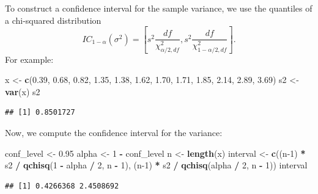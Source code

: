 \documentclass[
]{article}
\newenvironment{Shaded}{\begin{snugshade}}{\end{snugshade}}
\newcommand{\DecValTok}[1]{\textcolor[rgb]{0.00,0.00,0.81}{#1}}
\newcommand{\FloatTok}[1]{\textcolor[rgb]{0.00,0.00,0.81}{#1}}
\newcommand{\FunctionTok}[1]{\textcolor[rgb]{0.13,0.29,0.53}{\textbf{#1}}}
\newcommand{\NormalTok}[1]{#1}
\newcommand{\OtherTok}[1]{\textcolor[rgb]{0.56,0.35,0.01}{#1}}
\newcommand{\SpecialCharTok}[1]{\textcolor[rgb]{0.81,0.36,0.00}{\textbf{#1}}}
\begin{document}
To construct a confidence interval for the sample variance, we use the
quantiles of a chi-squared distribution
\[IC_{1-\alpha}(\sigma^2) = \left[ s^2 \frac{df}{\chi^2_{\alpha/2, df}}, s^2 \frac{df}{\chi^2_{1 - \alpha/2, df}} \right].\]
For example:

\begin{Shaded}
\begin{Highlighting}[]
\NormalTok{x }\OtherTok{\textless{}{-}} \FunctionTok{c}\NormalTok{(}\FloatTok{0.39}\NormalTok{, }\FloatTok{0.68}\NormalTok{, }\FloatTok{0.82}\NormalTok{, }\FloatTok{1.35}\NormalTok{, }\FloatTok{1.38}\NormalTok{, }\FloatTok{1.62}\NormalTok{, }\FloatTok{1.70}\NormalTok{, }\FloatTok{1.71}\NormalTok{, }\FloatTok{1.85}\NormalTok{, }\FloatTok{2.14}\NormalTok{, }\FloatTok{2.89}\NormalTok{, }\FloatTok{3.69}\NormalTok{)}
\NormalTok{s2 }\OtherTok{\textless{}{-}} \FunctionTok{var}\NormalTok{(x)}
\NormalTok{s2}
\end{Highlighting}
\end{Shaded}

\begin{verbatim}
## [1] 0.8501727
\end{verbatim}

Now, we compute the confidence interval for the variance:

\begin{Shaded}
\begin{Highlighting}[]
\NormalTok{conf\_level }\OtherTok{\textless{}{-}} \FloatTok{0.95}
\NormalTok{alpha }\OtherTok{\textless{}{-}} \DecValTok{1} \SpecialCharTok{{-}}\NormalTok{ conf\_level}
\NormalTok{n }\OtherTok{\textless{}{-}} \FunctionTok{length}\NormalTok{(x)}
\NormalTok{interval }\OtherTok{\textless{}{-}} \FunctionTok{c}\NormalTok{((n}\DecValTok{{-}1}\NormalTok{) }\SpecialCharTok{*}\NormalTok{ s2 }\SpecialCharTok{/} \FunctionTok{qchisq}\NormalTok{(}\DecValTok{1} \SpecialCharTok{{-}}\NormalTok{ alpha }\SpecialCharTok{/} \DecValTok{2}\NormalTok{, n }\SpecialCharTok{{-}} \DecValTok{1}\NormalTok{), }
\NormalTok{              (n}\DecValTok{{-}1}\NormalTok{) }\SpecialCharTok{*}\NormalTok{ s2 }\SpecialCharTok{/} \FunctionTok{qchisq}\NormalTok{(alpha }\SpecialCharTok{/} \DecValTok{2}\NormalTok{, n }\SpecialCharTok{{-}} \DecValTok{1}\NormalTok{))}
\NormalTok{interval}
\end{Highlighting}
\end{Shaded}

\begin{verbatim}
## [1] 0.4266368 2.4508692
\end{verbatim}
\end{document}
